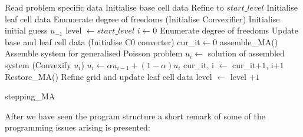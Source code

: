 \begin{algorithm}[h]
\begin{algorithmic}
	\State Read problem specific data
	\State Initialise base cell data
	\State Refine to $start\_level$
	\State Initialise leaf cell data
	\State Enumerate degree of freedoms
	\State (Initialise Convexifier)
	\State Initialise initial guess $u_{-1}$
	\State level $\gets start\_level$
	\State $i \gets 0$
		\State Enumerate degree of freedoms
		\State Update base and leaf cell data
		\State (Initialise C0 converter) 
		\State cur\_it$ \gets 0$
			\State  assemble\_MA()                              \Comment Assemble system for generalised Poisson problem
			\State $u_i \gets$ solution of assembled system
			\State (Convexify $u_i$)		 
			\State $u_i \gets \alpha u_{i-1}  +(1-\alpha) u_i$
			\State	cur\_it, i $\gets$ cur\_it$+1$, i$+1$
			\State Restore\_MA() 		
		\EndWhile
		\State Refine grid and update leaf cell data
		\State level $\gets$ level $+1$
	\EndWhile
\end{algorithmic}
\caption{stepping\_MA}
\label{alg: stepping}
\end{algorithm}

After we have seen the program structure a short remark of some of the programming issues arising is presented:

